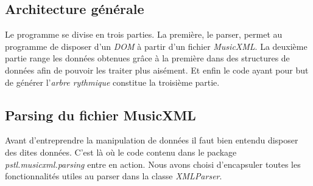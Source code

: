 \subsection{Architecture générale}

\par
Le programme se divise en trois parties. La première, le parser, permet au programme de disposer d'un \emph{DOM} à partir d'un fichier \emph{MusicXML}. La deuxième partie range les données obtenues grâce à la première dans des structures de données afin de pouvoir les traiter plus aisément. Et enfin le code ayant pour but de générer l'\emph{arbre rythmique} constitue la troisième partie.


\subsection{Parsing du fichier MusicXML}

\par
Avant d'entreprendre la manipulation de données il faut bien entendu disposer des dites données. C'est là où le code contenu dans le package \emph{pstl.musicxml.parsing} entre en action. Nous avons choisi d'encapsuler toutes les fonctionnalités utiles au parser dans la classe \emph{XMLParser}.



